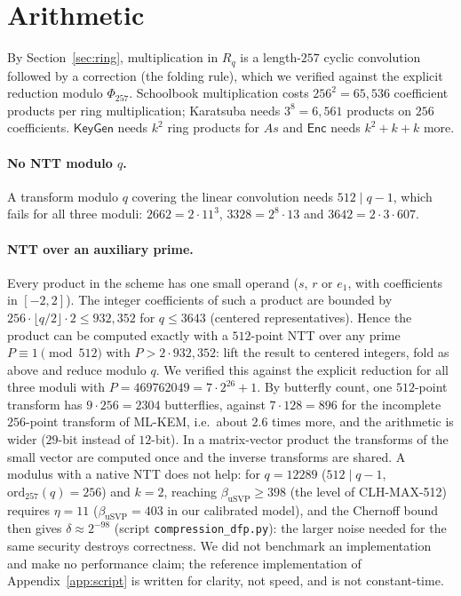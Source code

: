 \documentclass[11pt]{article}
\theoremstyle{remark}
\newcommand{\Rq}{R_q}
\begin{document}
\section{Arithmetic}\label{sec:arith}
By Section~\ref{sec:ring}, multiplication in $\Rq$ is a length-$257$ cyclic convolution followed by a correction (the folding rule), which we verified against the explicit reduction modulo $\Phi_{257}$. Schoolbook multiplication costs $256^2=65{,}536$ coefficient products per ring multiplication; Karatsuba needs $3^8=6{,}561$ products on $256$ coefficients. $\mathsf{KeyGen}$ needs $k^2$ ring products for $As$ and $\mathsf{Enc}$ needs $k^2+k+k$ more.

\paragraph{No NTT modulo $q$.} A transform modulo $q$ covering the linear convolution needs $512\mid q-1$, which fails for all three moduli: $2662=2\cdot11^3$, $3328=2^8\cdot13$ and $3642=2\cdot3\cdot607$.

\paragraph{NTT over an auxiliary prime.} Every product in the scheme has one small operand ($s$, $r$ or $e_1$, with coefficients in $[-2,2]$). The integer coefficients of such a product are bounded by $256\cdot\lfloor q/2\rfloor\cdot2\le932{,}352$ for $q\le3643$ (centered representatives). Hence the product can be computed exactly with a $512$-point NTT over any prime $P\equiv1\pmod{512}$ with $P>2\cdot932{,}352$: lift the result to centered integers, fold as above and reduce modulo $q$. We verified this against the explicit reduction for all three moduli with $P=469762049=7\cdot2^{26}+1$. By butterfly count, one $512$-point transform has $9\cdot256=2304$ butterflies, against $7\cdot128=896$ for the incomplete $256$-point transform of ML-KEM, i.e.\ about $2.6$ times more, and the arithmetic is wider ($29$-bit instead of $12$-bit). In a matrix-vector product the transforms of the small vector are computed once and the inverse transforms are shared. A modulus with a native NTT does not help: for $q=12289$ ($512\mid q-1$, $\mathrm{ord}_{257}(q)=256$) and $k=2$, reaching $\beta_{\mathrm{uSVP}}\ge398$ (the level of CLH-MAX-512) requires $\eta=11$ ($\beta_{\mathrm{uSVP}}=403$ in our calibrated model), and the Chernoff bound then gives $\delta\approx2^{-98}$ (script \texttt{compression\_\allowbreak dfp.py}): the larger noise needed for the same security destroys correctness. We did not benchmark an implementation and make no performance claim; the reference implementation of Appendix~\ref{app:script} is written for clarity, not speed, and is not constant-time.
\end{document}

